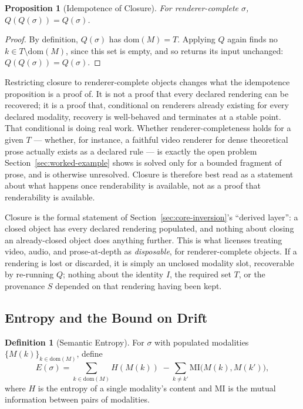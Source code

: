 \documentclass[11pt]{article}
\newtheorem{proposition}[theorem]{Proposition}
\theoremstyle{definition}
\newtheorem{definition}[theorem]{Definition}
\begin{document}
\begin{proposition}[Idempotence of Closure]
\label{prop:idempotent}
For renderer-complete $\sigma$, $Q(Q(\sigma)) = Q(\sigma)$.
\end{proposition}

\begin{proof}
By definition, $Q(\sigma)$ has $\mathrm{dom}(M) = T$. Applying $Q$ again finds no $k \in T \setminus \mathrm{dom}(M)$, since this set is empty, and so returns its input unchanged: $Q(Q(\sigma)) = Q(\sigma)$.
\end{proof}

Restricting closure to renderer-complete objects changes what the idempotence proposition is a proof of. It is not a proof that every declared rendering can be recovered; it is a proof that, conditional on renderers already existing for every declared modality, recovery is well-behaved and terminates at a stable point. That conditional is doing real work. Whether renderer-completeness holds for a given $T$ --- whether, for instance, a faithful video renderer for dense theoretical prose actually exists as a declared rule --- is exactly the open problem Section~\ref{sec:worked-example} shows is solved only for a bounded fragment of prose, and is otherwise unresolved. Closure is therefore best read as a statement about what happens once renderability is available, not as a proof that renderability is available.

Closure is the formal statement of Section~\ref{sec:core-inversion}'s ``derived layer'': a closed object has every declared rendering populated, and nothing about closing an already-closed object does anything further. This is what licenses treating video, audio, and prose-at-depth as \emph{disposable}, for renderer-complete objects. If a rendering is lost or discarded, it is simply an unclosed modality slot, recoverable by re-running $Q$; nothing about the identity $I$, the required set $T$, or the provenance $S$ depended on that rendering having been kept.

\subsection{Entropy and the Bound on Drift}

\begin{definition}[Semantic Entropy]
\label{def:entropy}
For $\sigma$ with populated modalities $\{M(k)\}_{k \in \mathrm{dom}(M)}$, define
\[
E(\sigma) = \sum_{k \in \mathrm{dom}(M)} H(M(k)) \; - \sum_{k \neq k'} \mathrm{MI}\bigl(M(k), M(k')\bigr),
\]
where $H$ is the entropy of a single modality's content and $\mathrm{MI}$ is the mutual information between pairs of modalities.
\end{definition}
\end{document}

